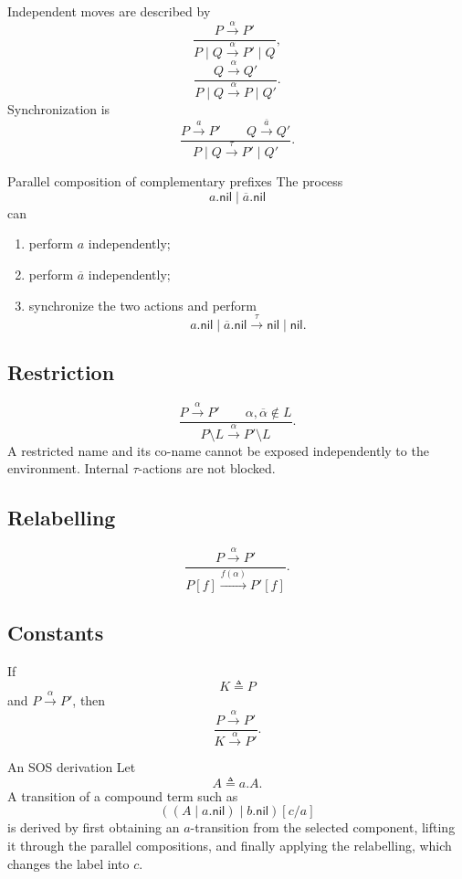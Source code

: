 \documentclass[a4paper]{article}
\newcommand{\nil}{\mathsf{nil}}
\newcommand{\trans}[1]{\xrightarrow{#1}}
\begin{document}
Independent moves are described by
\[
    \frac{P\trans{\alpha}P'}
    {P\mid Q\trans{\alpha}P'\mid Q},
    \tag{COM1}
\]
\[
    \frac{Q\trans{\alpha}Q'}
    {P\mid Q\trans{\alpha}P\mid Q'}.
    \tag{COM2}
\]
Synchronization is
\[
    \frac{P\trans{a}P'\qquad Q\trans{\overline a}Q'}
    {P\mid Q\trans{\tau}P'\mid Q'}.
    \tag{COM3}
\]

\begin{snippetexample}{Parallel composition of complementary prefixes}
    The process
    \[
        a.\nil\mid\overline a.\nil
    \]
    can
    \begin{enumerate}
        \item perform \(a\) independently;
        \item perform \(\overline a\) independently;
        \item synchronize the two actions and perform
        \[
            a.\nil\mid\overline a.\nil
            \trans{\tau}
            \nil\mid\nil.
        \]
    \end{enumerate}
\end{snippetexample}

\subsection{Restriction}

\[
    \frac{P\trans{\alpha}P'\qquad
    \alpha,\overline\alpha\notin L}
    {P\setminus L\trans{\alpha}P'\setminus L}.
    \tag{RES}
\]
A restricted name and its co-name cannot be exposed independently to the environment.
Internal \(\tau\)-actions are not blocked.

\subsection{Relabelling}

\[
    \frac{P\trans{\alpha}P'}
    {P[f]\trans{f(\alpha)}P'[f]}.
    \tag{REL}
\]

\subsection{Constants}

If
\[
    K\triangleq P
\]
and \(P\trans{\alpha}P'\), then
\[
    \frac{P\trans{\alpha}P'}{K\trans{\alpha}P'}.
    \tag{CON}
\]

\begin{snippetexample}{An SOS derivation}
    Let
    \[
        A\triangleq a.A.
    \]
    A transition of a compound term such as
    \[
        ((A\mid a.\nil)\mid b.\nil)[c/a]
    \]
    is derived by first obtaining an \(a\)-transition from the selected component, lifting it through the parallel compositions, and finally applying the relabelling, which changes the label into \(c\).
\end{snippetexample}
\end{document}
